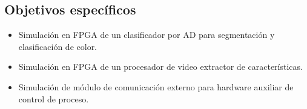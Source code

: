 \documentclass[twoside,spanish,ESP,MSc]{plantillaLabUPV}
\theoremstyle{definition}
\begin{document}
\subsection*{Objetivos específicos}
\begin{itemize}[noitemsep]
 \item Simulación en FPGA de un clasificador por AD para segmentación y clasificación de color.
 \item Simulación en FPGA de un procesador de video extractor de características.
 \item Simulación de módulo de comunicación externo para hardware auxiliar de control de proceso.

\end{itemize}

% 
\end{document}
